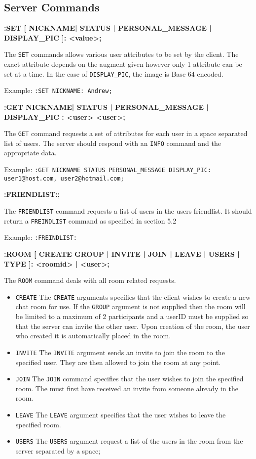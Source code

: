 \subsection{Server Commands}

{\bf :SET [ NICKNAME| STATUS | PERSONAL_MESSAGE | DISPLAY_PIC ]: <value>;}

The \texttt{SET} commands allows various user attributes to be set by the client. The exact attribute depends on the augment given however only 1 attribute can be set at a time. In the case of \texttt{DISPLAY_PIC}, the image is Base 64 encoded.

Example:
\texttt{:SET NICKNAME: Andrew;}

{\bf :GET { NICKNAME| STATUS | PERSONAL_MESSAGE | DISPLAY_PIC }: <user>{    <user>};}

The \texttt{GET} command requests a set of attributes for each user in a space separated list of users. The server should respond with an \texttt{INFO} command and the appropriate data.

Example:
\texttt{:GET NICKNAME STATUS PERSONAL_MESSAGE DISPLAY_PIC: user1@host.com, user2@hotmail.com;}

{\bf :FRIENDLIST:;}

The \texttt{FRIENDLIST} command requests a list of users in the users friendlist. It should return a \texttt{FREINDLIST} command as specified in section 5.2

Example:
\texttt{:FREINDLIST:} 
	
{\bf :ROOM [ CREATE {GROUP} | INVITE | JOIN | LEAVE | USERS | TYPE ]: {<roomid> | <user>};}

The \texttt{ROOM} command deals with all room related requests.

\begin{itemize}

\item \texttt{CREATE}
The \texttt{CREATE} arguments specifies that the client wishes to create a new chat room for use. If the \texttt{GROUP} argument is not supplied then the room will be limited to a maximum of 2 participants and a userID must be supplied so that the server can invite the other user. Upon creation of the room, the user who created it is automatically placed in the room.

\item \texttt{INVITE}
The \texttt{INVITE} argument sends an invite to join the room to the specified user. They are then allowed to join the room at any point.

\item \texttt{JOIN}
The \texttt{JOIN} command specifies that the user wishes to join the specified room. The must first have received an invite from someone already in the room.

\item \texttt{LEAVE}
The \texttt{LEAVE} argument specifies that the user wishes to leave the specified room.

\item \texttt{USERS}
The \texttt{USERS} argument request a list of the users in the room from the server separated by a space;

\end{itemize}

